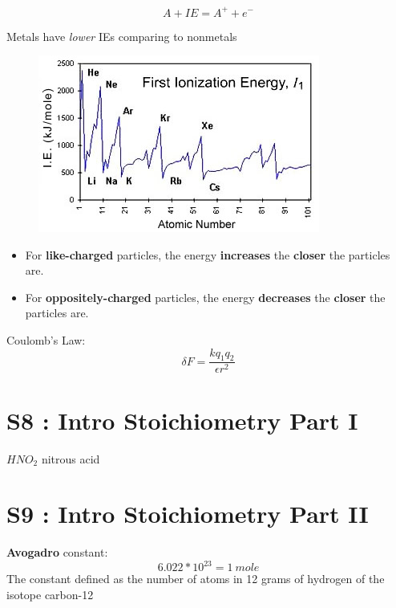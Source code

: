 \documentclass[12pt]{article}
\begin{document}
\begin{equation}
A + IE = A^+ + e^-
\end{equation}

Metals have \emph{lower} IEs comparing to nonmetals

\begin{figure}[h]
\centering
\includegraphics{IEgraph}
\end{figure}


\begin{itemize}
\item For \textbf{like-charged} particles, the energy \textbf{increases} the \textbf{closer} the particles are.
\item For \textbf{oppositely-charged} particles, the energy \textbf{decreases} the \textbf{closer} the particles are. 
\end{itemize}



Coulomb's Law:
\begin{equation}
\delta F = \frac{kq_1q_2}{\epsilon r^2}
\end{equation}

\section {S8 : Intro Stoichiometry Part I}

$HNO_2$ nitrous acid 

\section {S9 : Intro Stoichiometry Part II}

\textbf{Avogadro} constant:
\begin{equation}
6.022*10^{23} = 1\ mole
\end{equation}
The constant defined as the number of atoms in 12 grams of hydrogen of the isotope carbon-12
\end{document}

